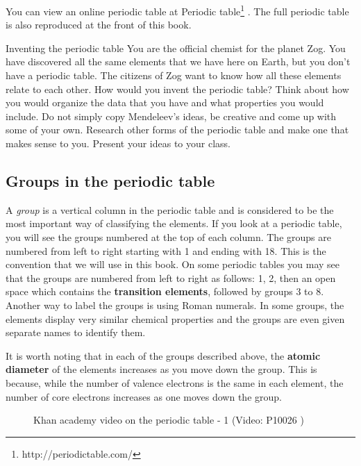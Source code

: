       \label{m38760*eip-773}You can view an online periodic table at Periodic table\footnote{http://periodictable.com/}
        . The full periodic table is also reproduced at the front of this book.\par \label{m38760*eip-400}
\begin{activity}{Inventing the periodic table}
            \nopagebreak
            \label{m38760*eip-603}
You are the official chemist for the planet Zog. You have discovered all the same elements that we have here on Earth, but you don't have a periodic table. The citizens of Zog want to know how all these elements relate to each other. How would you invent the periodic table? Think about how you would organize the data that you have and what properties you would include. Do not simply copy Mendeleev's ideas, be creative and come up with some of your own. Research other forms of the periodic table and make one that makes sense to you. Present your ideas to your class. 
\end{activity}            

\subsection*{Groups in the periodic table}
            \nopagebreak
            \label{m38760*id261554}A \textsl{group} is a vertical column in the periodic table and is considered to be the most important way of classifying the elements. If you look at a periodic table, you will see the groups numbered at the top of each column. The groups are numbered from left to right starting with 1 and ending with 18. This is the convention that we will use in this book. On some periodic tables you may see that the groups are numbered from left to right as follows: 1, 2, then an open space which contains the \textbf{transition elements}, followed by groups 3 to 8. Another way to label the groups is using Roman numerals. In some groups, the elements display very similar chemical properties and the groups are even given separate names to identify them.\par 
        \label{m38760*id261833}It is worth noting that in each of the groups described above, the \textbf{atomic diameter} of the elements increases as you move down the group. This is because, while the number of valence electrons is the same in each element, the number of core electrons increases as one moves down the group.\par \label{m38760*eip-148}
    \setcounter{subfigure}{0}
	\begin{figure}[H] %
    \textnormal{Khan academy video on the periodic table - 1}\vspace{.1in} \nopagebreak
  \label{m38760*yt-media1}\label{m38760*yt-video1}
             { (Video:  P10026 )}
      \vspace{2pt}
    \vspace{.1in}
 \end{figure}       \par 
      \label{m38760*uid146}
